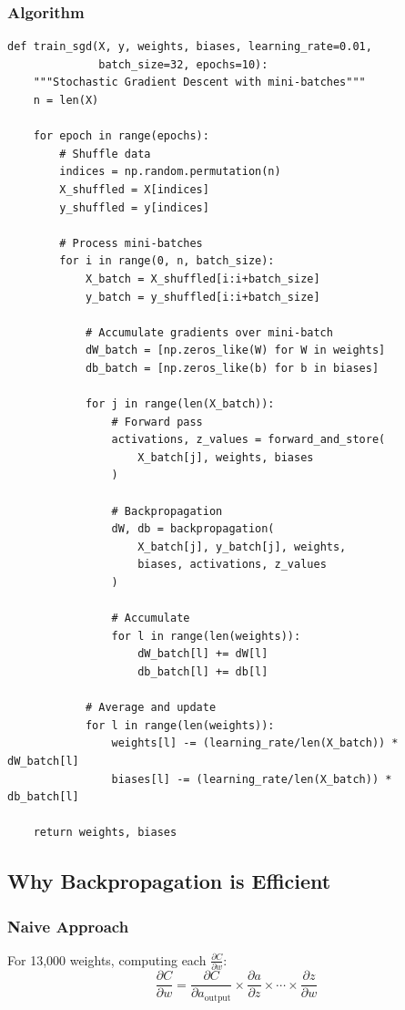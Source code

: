 \documentclass[11pt,a4paper]{article}
\begin{document}
\subsubsection{Algorithm}
\begin{lstlisting}
def train_sgd(X, y, weights, biases, learning_rate=0.01, 
              batch_size=32, epochs=10):
    """Stochastic Gradient Descent with mini-batches"""
    n = len(X)
    
    for epoch in range(epochs):
        # Shuffle data
        indices = np.random.permutation(n)
        X_shuffled = X[indices]
        y_shuffled = y[indices]
        
        # Process mini-batches
        for i in range(0, n, batch_size):
            X_batch = X_shuffled[i:i+batch_size]
            y_batch = y_shuffled[i:i+batch_size]
            
            # Accumulate gradients over mini-batch
            dW_batch = [np.zeros_like(W) for W in weights]
            db_batch = [np.zeros_like(b) for b in biases]
            
            for j in range(len(X_batch)):
                # Forward pass
                activations, z_values = forward_and_store(
                    X_batch[j], weights, biases
                )
                
                # Backpropagation
                dW, db = backpropagation(
                    X_batch[j], y_batch[j], weights, 
                    biases, activations, z_values
                )
                
                # Accumulate
                for l in range(len(weights)):
                    dW_batch[l] += dW[l]
                    db_batch[l] += db[l]
            
            # Average and update
            for l in range(len(weights)):
                weights[l] -= (learning_rate/len(X_batch)) * dW_batch[l]
                biases[l] -= (learning_rate/len(X_batch)) * db_batch[l]
    
    return weights, biases
\end{lstlisting}

\subsection{Why Backpropagation is Efficient}

\subsubsection{Naive Approach}
For 13,000 weights, computing each $\frac{\partial C}{\partial w}$:
\[
\frac{\partial C}{\partial w} = \frac{\partial C}{\partial a_{\text{output}}} \times \frac{\partial a}{\partial z} \times \cdots \times \frac{\partial z}{\partial w}
\]
\end{document}
